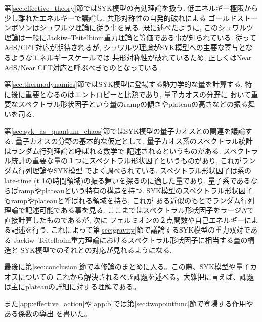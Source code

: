 第\ref{sec:effective_theory}節ではSYK模型の有効理論を扱う. 
低エネルギー極限から少し離れたエネルギーで議論し, 共形対称性の自発的破れによる
ゴールドストーンボソンはシュワルツ理論に従う事を見る. 
既に述べたように, このシュワルツ理論は一般にJackiw--Teitelbiom重力理論と等価である事が知られている. 
従ってAdS/CFT対応が期待されるが, シュワルツ理論がSYK模型への主要な寄与となるようなエネルギースケールでは
共形対称性が破れているため, 正しくはNear AdS/Near CFT対応と呼ぶべきものとなっている. 

第\ref{sec:thermodynamics}節ではSYK模型に登場する熱力学的な量を計算する. 
特に後に重要となるのはエントロピーと比熱であり, 量子カオスの分野に
おいて重要なスペクトラル形状因子という量のrampの傾きやplateauの高さなどの振る舞いを司る. 

第\ref{sec:syk_as_quantum_chaos}節ではSYK模型の量子カオスとの関連を議論する. 
量子カオスの分野の基本的な仮定として, 量子カオス系のスペクトラル統計はランダム行列理論と呼ばれる数学で
記述されるというものがある. 
スペクトラル統計の重要な量の１つにスペクトラル形状因子というものがあり, これがランダム行列理論やSYK模型
でよく調べられている. 
スペクトラル形状因子は系のlate-time (t \gg 1の時間領域)の振る舞いを探るのに適した量であり, 
量子系であるならばrampやplateauという特有の構造を持つ. 
SYK模型のスペクトラル形状因子もrampやplateauと呼ばれる領域を持ち, これが
ある近似のもとでランダム行列理論で記述可能である事を見る. 
ここまではスペクトラル形状因子をラージ$N$で直接計算したものであるが, 次に
フェルミオンの２点関数や自己エネルギーによる記述を行う. 
これによって第\ref{sec:gravity}節で議論するSYK模型の重力双対である
Jackiw--Teitelboim重力理論におけるスペクトラル形状因子に相当する量の構造と
SYK模型でのそれとの対応が見れるようになる. 

最後に第\ref{sec:conclusion}節で本修論のまとめに入る。この際、SYK模型や量子カオスについての
これから解決されるべき課題を述べる。大雑把に言えば、課題は主にplateauの詳細に対する理解である。

また\ref{app:effective_action}や\ref{app:b}では第\ref{sec:twopointfunc}節で登場する作用やある係数の導出
を書いた。

\pagebreak

